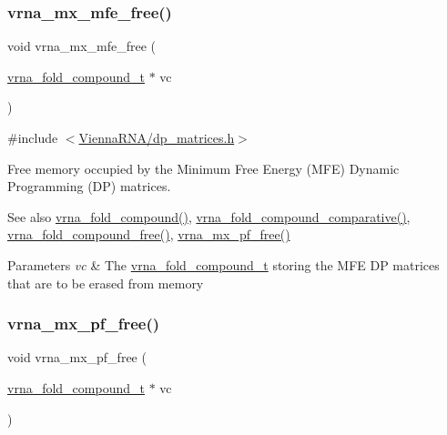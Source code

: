 \subsubsection{\texorpdfstring{vrna\+\_\+mx\+\_\+mfe\+\_\+free()}{vrna\_mx\_mfe\_free()}}
{\footnotesize\ttfamily void vrna\+\_\+mx\+\_\+mfe\+\_\+free (\begin{DoxyParamCaption}\item[{\hyperlink{group__fold__compound_ga1b0cef17fd40466cef5968eaeeff6166}{vrna\+\_\+fold\+\_\+compound\+\_\+t} $\ast$}]{vc }\end{DoxyParamCaption})}



{\ttfamily \#include $<$\hyperlink{dp__matrices_8h}{Vienna\+R\+N\+A/dp\+\_\+matrices.\+h}$>$}



Free memory occupied by the Minimum Free Energy (M\+FE) Dynamic Programming (DP) matrices. 

\begin{DoxySeeAlso}{See also}
\hyperlink{group__fold__compound_ga6601d994ba32b11511b36f68b08403be}{vrna\+\_\+fold\+\_\+compound()}, \hyperlink{group__fold__compound_gad6bacc816af274922b13d947f708aa0c}{vrna\+\_\+fold\+\_\+compound\+\_\+comparative()}, \hyperlink{group__fold__compound_ga576a077b418a9c3650e06f8e5d296fc2}{vrna\+\_\+fold\+\_\+compound\+\_\+free()}, \hyperlink{group__dp__matrices_ga2283e69fd139fb8e58d7ade3b5773f9c}{vrna\+\_\+mx\+\_\+pf\+\_\+free()}
\end{DoxySeeAlso}

\begin{DoxyParams}{Parameters}
{\em vc} & The \hyperlink{group__fold__compound_ga1b0cef17fd40466cef5968eaeeff6166}{vrna\+\_\+fold\+\_\+compound\+\_\+t} storing the M\+FE DP matrices that are to be erased from memory \\
\hline
\end{DoxyParams}
\mbox{\label{group__dp__matrices_ga2283e69fd139fb8e58d7ade3b5773f9c}} 
\subsubsection{\texorpdfstring{vrna\+\_\+mx\+\_\+pf\+\_\+free()}{vrna\_mx\_pf\_free()}}
{\footnotesize\ttfamily void vrna\+\_\+mx\+\_\+pf\+\_\+free (\begin{DoxyParamCaption}\item[{\hyperlink{group__fold__compound_ga1b0cef17fd40466cef5968eaeeff6166}{vrna\+\_\+fold\+\_\+compound\+\_\+t} $\ast$}]{vc }\end{DoxyParamCaption})}



